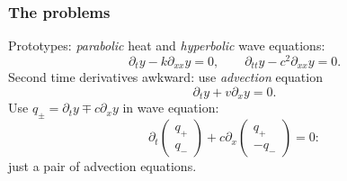 \documentclass{beamer}
\begin{document}
\begin{frame}
  \frametitle{The problems}

  Prototypes: \emph{parabolic} heat and \emph{hyperbolic} wave equations:
  \begin{equation*}
    \partial_{t} y - k \partial_{x x} y = 0, \qquad \partial_{t t} y -
    c^2 \partial_{x x} y = 0.
  \end{equation*} \pause
  Second time derivatives awkward: use \emph{advection} equation
  \begin{equation*}
    \partial_{t} y + v \partial_{x} y = 0.
  \end{equation*} \pause
  Use $q_{\pm} = \partial_t y \mp c \partial_x y$ in wave equation:
  \begin{equation*}
    \partial_t
    \begin{pmatrix}
      q_+ \\ q_-
    \end{pmatrix} + c \partial_x
    \begin{pmatrix}
      q_+ \\ -q_-
    \end{pmatrix} = 0:
  \end{equation*}
  just a pair of advection equations.


\end{frame}
\end{document}
